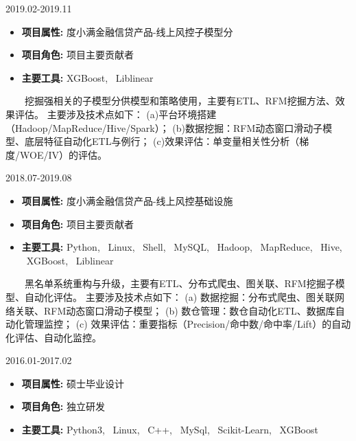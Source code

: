 \documentclass{resume}
\begin{document}
                      {2019.02-2019.11}

\begin{itemize}  [parsep=0.5ex]

  \item   \textbf{  项目属性:  }   {  度小满金融信贷产品-线上风控子模型分  }                
  \item   \textbf{  项目角色:  }   {  项目主要贡献者  }
  \item   \textbf{  主要工具:  }   {  XGBoost, \ Liblinear  }

\end{itemize}


{    \ \ \ \ 挖掘强相关的子模型分供模型和策略使用，主要有ETL、RFM挖掘方法、效果评估。
主要涉及技术点如下：
(a)平台环境搭建（Hadoop/MapReduce/Hive/Spark）；
(b)数据挖掘：RFM动态窗口滑动子模型、底层特征自动化ETL与例行；
(c)效果评估：单变量相关性分析（梯度/WOE/IV）的评估。}

\medskip





                             {2018.07-2019.08}

\begin{itemize} [parsep=0.5ex]

\item   \textbf{  项目属性:  }  {  度小满金融信贷产品-线上风控基础设施  }
\item   \textbf{  项目角色:  }  {  项目主要贡献者  }
\item   \textbf{  主要工具:  }  {  Python, \ Linux, \ Shell, \ MySQL, \ Hadoop, \ MapReduce, \ Hive, \ XGBoost, \ Liblinear  }

\end{itemize}


{  \ \ \ \ 黑名单系统重构与升级，主要有ETL、分布式爬虫、图关联、RFM挖掘子模型、自动化评估。
主要涉及技术点如下：
(a) 数据挖掘：分布式爬虫、图关联网络关联、RFM动态窗口滑动子模型；
(b) 数仓管理：数仓自动化ETL、数据库自动化管理监控；
(c) 效果评估：重要指标（Precision/命中数/命中率/Lift）的自动化评估、自动化监控。}

\medskip





                   {2016.01-2017.02}

\begin{itemize} [parsep=0.3ex]

\item   \textbf{ 项目属性: }   {硕士毕业设计}
\item   \textbf{ 项目角色: }   {独立研发}    
\item   \textbf{ 主要工具: }  { Python3,  \ Linux,  \ C++,  \ MySql,  \ Scikit-Learn,  \ XGBoost }

\end{itemize}
\end{document}
